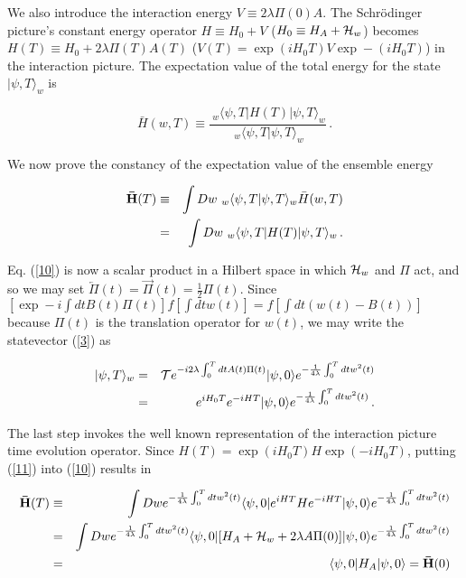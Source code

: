 \documentclass[12pt]{article}
\begin{document}
	We also introduce the interaction energy $V\equiv 2\lambda \Pi (0) A$. 
The Schr\"odinger picture's constant energy operator 
$H\equiv H_{0} +V$ ($H_{0}\equiv H_{A}+{\cal H}_{w}$) 
 becomes $H(T)\equiv H_{0}+2\lambda \Pi(T) A(T)$  
($V(T)=\exp (iH_{0}T)V\exp-(iH_{0}T)$) in the interaction picture. 
The expectation value of the total energy for the state $|\psi,T\rangle _{w}$ is

\begin{equation}\label{9}
\bar{H}(w,T)\equiv \frac{\ _{w}\langle \psi,T|H(T)|\psi,T\rangle _{w}}
{\ _{w}\langle \psi,T|\psi,T\rangle _{w}}\, .
\end{equation}

	We now prove the constancy of the expectation value of the ensemble energy 
	
\begin{eqnarray}\label{10}
{\bf \bar{H}}(T)&\equiv&\int 
Dw \ _{w}\langle \psi,T|\psi,T\rangle _{w}\bar{H}(w,T)\nonumber\\
&=&\int Dw \ _{w}\langle \psi,T|H(T)|\psi,T\rangle _{w}\, .
\end{eqnarray}

\noindent Eq. (\ref{10}) is now a scalar product in a Hilbert space in 
which ${\cal H}_{w}$ and $\Pi$ act, and so we may set 
$\overleftarrow\Pi (t)=\overrightarrow\Pi (t)=\frac{1}{2}\Pi (t)$.  Since 
$[\exp-i\int dt B(t)\Pi (t)]f[\int dt w(t)]=f[\int dt (w(t)-B(t))]$ because 
$\Pi (t)$ is the translation operator for $w(t)$,  
we may write the statevector (\ref{3}) as 

\begin{eqnarray}\label{11}
|\psi,T\rangle _{w}&=&{\cal T}e^{-i2\lambda\int_{0}^{T}dtA(t)\Pi (t)}
|\psi,0\rangle e^{-\frac{1}{4\lambda}\int_{0}^{T}dtw^{2}(t)}\nonumber\\
&=&e^{iH_{0}T}e^{-iHT}|\psi,0\rangle 
e^{-\frac{1}{4\lambda}\int_{0}^{T}dtw^{2}(t)}\, .	
\end{eqnarray}

\noindent The last step invokes the well known representation 
of the interaction picture time evolution operator. Since 
$H(T)=\exp(iH_{0}T)H\exp(-iH_{0}T)$, putting (\ref{11}) into (\ref{10}) results in 

\begin{eqnarray}\label{12}
{\bf \bar{H}}(T)&\equiv&\int 
Dw e^{-\frac{1}{4\lambda}\int_{0}^{T}dtw^{2}(t)}\langle \psi,0|
e^{iHT}He^{-iHT}|\psi,0\rangle e^{-\frac{1}{4\lambda}\int_{0}^{T}dtw^{2}(t)}\nonumber\\
&=&\int Dw e^{-\frac{1}{4\lambda}\int_{0}^{T}dtw^{2}(t)}
\langle \psi,0|[H_{A}+{\cal H}_{w}+2\lambda A \Pi(0)]|\psi,0\rangle 
e^{-\frac{1}{4\lambda}\int_{0}^{T}dtw^{2}(t)}\nonumber\\
&=&\langle \psi,0|H_{A}|\psi,0\rangle ={\bf \bar{H}}(0)
\end{eqnarray}
\end{document}
